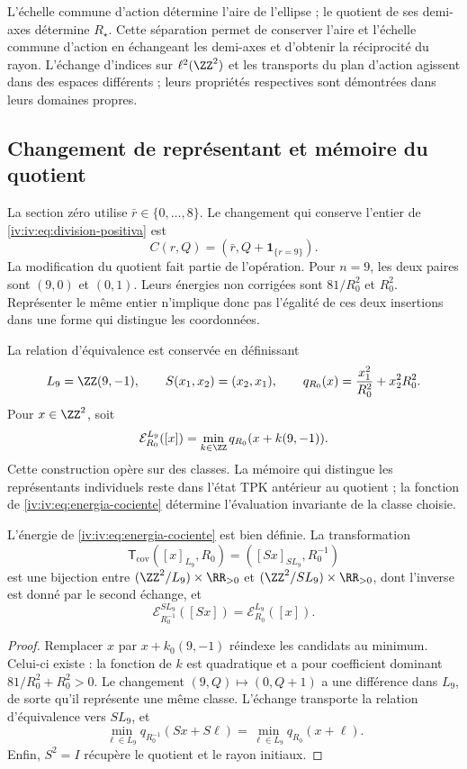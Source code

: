 L’échelle commune d’action détermine l’aire de l’ellipse ; le quotient
de ses demi-axes détermine \(R_\star\). Cette séparation permet de conserver
l’aire et l’échelle commune d’action en échangeant les demi-axes et d’obtenir la réciprocité
du rayon. L’échange d’indices sur \(\ell^2(\ZZ^2)\)
et les transports du plan d’action agissent dans des espaces différents ;
leurs propriétés respectives sont démontrées dans leurs domaines propres.

\subsection{Changement de représentant et mémoire du quotient}

La section zéro utilise \(\bar r\in\{0,\ldots,8\}\). Le changement
qui conserve l’entier de \eqref{iv:iv:eq:division-positiva} est
\begin{equation}
 C(r,Q)=(\bar r,Q+\mathbf1_{\{r=9\}}).
 \label{iv:iv:eq:cambio-seccion}
\end{equation}
La modification du quotient fait partie de l’opération.
Pour \(n=9\), les deux paires sont \((9,0)\) et \((0,1)\).
Leurs énergies non corrigées sont \(81/R_0^2\) et \(R_0^2\).
Représenter le même entier n’implique donc pas l’égalité de
ces deux insertions dans une forme qui distingue les coordonnées.

La relation d’équivalence est conservée en définissant
\[
 L_9=\ZZ(9,-1),\qquad S(x_1,x_2)=(x_2,x_1),
 \qquad q_{R_0}(x)=\frac{x_1^2}{R_0^2}+x_2^2R_0^2.
\]
Pour \(x\in\ZZ^2\), soit
\begin{equation}
 \mathcal E_{R_0}^{L_9}([x])
 =\min_{k\in\ZZ}q_{R_0}(x+k(9,-1)).
 \label{iv:iv:eq:energia-cociente}
\end{equation}
Cette construction opère sur des classes. La mémoire qui distingue
les représentants individuels reste dans l’état TPK antérieur
au quotient ; la fonction de \eqref{iv:iv:eq:energia-cociente}
détermine l’évaluation invariante de la classe choisie.

\begin{theorem}
\label{iv:iv:thm:dualidad-cociente}
L’énergie de \eqref{iv:iv:eq:energia-cociente} est bien définie.
La transformation
\[
 \mathsf T_{\mathrm{cov}}([x]_{L_9},R_0)
 =([Sx]_{SL_9},R_0^{-1})
\]
est une bijection entre
\((\ZZ^2/L_9)\times\RR_{>0}\) et
\((\ZZ^2/SL_9)\times\RR_{>0}\), dont l’inverse est donné par le
second échange, et
\[
 \mathcal E_{R_0^{-1}}^{SL_9}([Sx])
 =\mathcal E_{R_0}^{L_9}([x]).
\]
\end{theorem}
\begin{proof}
Remplacer \(x\) par \(x+k_0(9,-1)\) réindexe les candidats
au minimum. Celui-ci existe : la fonction de \(k\) est quadratique et
a pour coefficient dominant \(81/R_0^2+R_0^2>0\). Le changement
\((9,Q)\mapsto(0,Q+1)\) a une différence dans \(L_9\), de
sorte qu’il représente une même classe. L’échange transporte
la relation d’équivalence vers \(SL_9\), et
\[
 \min_{\ell\in L_9}q_{R_0^{-1}}(Sx+S\ell)
 =\min_{\ell\in L_9}q_{R_0}(x+\ell).
\]
Enfin, \(S^2=I\) récupère le quotient et le rayon initiaux.
\end{proof}

